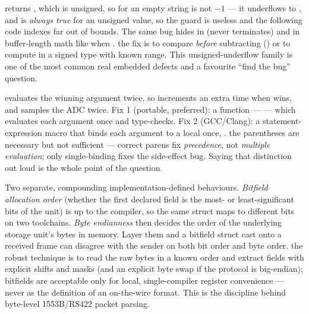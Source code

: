  returns , which is unsigned, so for an empty
string  is not $-1$ --- it underflows to ,
and  is \emph{always true} for an unsigned value, so the guard is
useless and the following code indexes far out of bounds. The same bug hides
in  (never terminates) and in
buffer-length math like  when . \trap the fix is to compare \emph{before} subtracting
() or to compute in a signed type with known range. This
unsigned-underflow family is one of the most common real embedded defects and
a favourite ``find the bug'' question.

 evaluates the winning
argument twice, so  increments  an extra time when
 wins, and  samples the ADC twice. Fix
1 (portable, preferred): a  function ---
 --- which
evaluates each argument once and type-checks. Fix 2 (GCC/Clang): a
statement-expression macro that binds each argument to a local once,
.
\trap the parentheses are necessary but not sufficient --- correct parens fix
\emph{precedence}, not \emph{multiple evaluation}; only single-binding fixes
the side-effect bug. Saying that distinction out loud is the whole point of
the question.

Two separate, compounding implementation-defined behaviours.
\emph{Bitfield allocation order} (whether the first declared field is the
most- or least-significant bits of the unit) is up to the compiler, so the
same struct maps to different bits on two toolchains. \emph{Byte endianness}
then decides the order of the underlying storage unit's bytes in memory.
Layer them and a bitfield struct cast onto a received frame can disagree with
the sender on both bit order and byte order. \trap the robust technique is to
read the raw bytes in a known order and extract fields with explicit shifts
and masks (and an explicit byte swap if the protocol is big-endian);
bitfields are acceptable only for local, single-compiler register
convenience --- never as the definition of an on-the-wire format. This is the
discipline behind byte-level 1553B/RS422 packet parsing.

